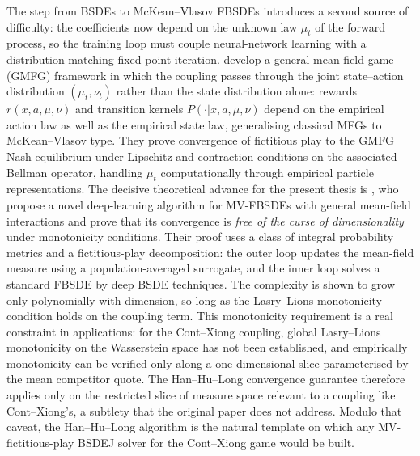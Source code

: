 The step from BSDEs to McKean--Vlasov FBSDEs introduces a second
source of difficulty: the coefficients now depend on the unknown law
$\mu_t$ of the forward process, so the training loop must couple
neural-network learning with a distribution-matching fixed-point
iteration.  \citet{guo2023} develop a general mean-field game (GMFG)
framework in which the coupling passes through the joint
state--action distribution $(\mu_t, \nu_t)$ rather than the state
distribution alone: rewards $r(x, a, \mu, \nu)$ and transition
kernels $P(\cdot | x, a, \mu, \nu)$ depend on the empirical action
law as well as the empirical state law, generalising classical
MFGs to McKean--Vlasov type.  They prove convergence of
fictitious play to the GMFG Nash equilibrium under Lipschitz and
contraction conditions on the associated Bellman operator,
handling $\mu_t$ computationally through empirical particle
representations.  The decisive theoretical advance for the
present thesis is \citet{han2022}, who propose a novel
deep-learning algorithm for MV-FBSDEs with general mean-field
interactions and prove that its convergence is \emph{free of the
curse of dimensionality} under monotonicity conditions.  Their proof
uses a class of integral probability metrics and a fictitious-play
decomposition: the outer loop updates the mean-field measure using
a population-averaged surrogate, and the inner loop solves a
standard FBSDE by deep BSDE techniques.  The complexity is shown to
grow only polynomially with dimension, so long as the Lasry--Lions
monotonicity condition holds on the coupling term.  This
monotonicity requirement is a real constraint in applications: for
the Cont--Xiong coupling, global Lasry--Lions monotonicity on the
Wasserstein space has not been established, and empirically
monotonicity can be verified only along a one-dimensional slice
parameterised by the mean competitor quote.  The Han--Hu--Long
convergence guarantee therefore applies only on the restricted
slice of measure space relevant to a coupling like Cont--Xiong's,
a subtlety that the original paper does not address.  Modulo that
caveat, the Han--Hu--Long algorithm is the natural template on
which any MV-fictitious-play BSDEJ solver for the Cont--Xiong
game would be built.

